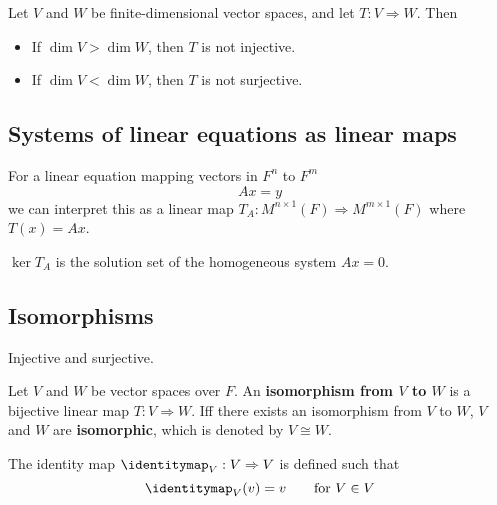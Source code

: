 \begin{theorem}
  Let $V$ and $W$ be finite-dimensional vector spaces, and let $T : V \Rightarrow W$. Then
  \begin{itemize}
    \item If $\dim V > \dim W$, then $T$ is not injective.
    \item If $\dim V < \dim W$, then $T$ is not surjective.
  \end{itemize}
\end{theorem}

\subsection{Systems of linear equations as linear maps}

\begin{definition}
  For a linear equation mapping vectors in $F^n$ to $F^m$ 
  \[
    Ax = y
  \]
  we can interpret this as a linear map $T_A : M^{n \times 1}(F) \Rightarrow M^{m \times 1}(F)$ where $T(x) = Ax$.
\end{definition}

\begin{theorem}
  $\ker T_A$ is the solution set of the homogeneous system $Ax = 0$.
\end{theorem}


\subsection{Isomorphisms}

\begin{definition}[Bijective]
  Injective and surjective.
\end{definition}

\begin{definition}[Isomorphism]
  Let $V$ and $W$ be vector spaces over $F$. An \textbf{isomorphism from $V$ to $W$} is a bijective linear map $T : V \Rightarrow W$. Iff there exists an isomorphism from $V$ to $W$, $V$ and $W$ are \textbf{isomorphic}, which is denoted by $V \cong W$.
\end{definition}

\begin{definition}
  The identity map $\identitymap_V : V \Rightarrow V$ is defined such that
  \[
    \identitymap_V(v) = v \qquad \text{for $V \in V$}
  \]
\end{definition}

